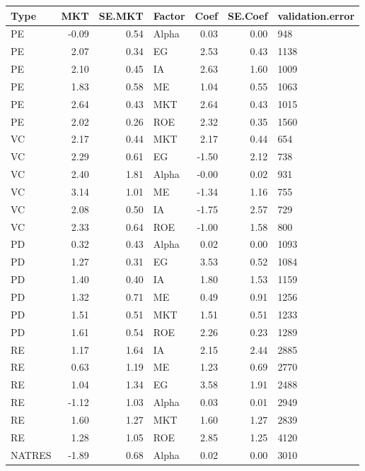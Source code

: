 \documentclass[12pt]{article}
\begin{document}
\begin{table}[ht]
	\centering
	\begin{tabular}{lrrlrrl}
		\hline
		Type & MKT & SE.MKT & Factor & Coef & SE.Coef & validation.error \\ 
		\hline
		PE & -0.09 & 0.54 & Alpha & 0.03 & 0.00 & 948 \\ 
		PE & 2.07 & 0.34 & EG & 2.53 & 0.43 & 1138 \\ 
		PE & 2.10 & 0.45 & IA & 2.63 & 1.60 & 1009 \\ 
		PE & 1.83 & 0.58 & ME & 1.04 & 0.55 & 1063 \\ 
		PE & 2.64 & 0.43 & MKT & 2.64 & 0.43 & 1015 \\ 
		PE & 2.02 & 0.26 & ROE & 2.32 & 0.35 & 1560 \\ 
		VC & 2.17 & 0.44 & MKT & 2.17 & 0.44 & 654 \\ 
		VC & 2.29 & 0.61 & EG & -1.50 & 2.12 & 738 \\ 
		VC & 2.40 & 1.81 & Alpha & -0.00 & 0.02 & 931 \\ 
		VC & 3.14 & 1.01 & ME & -1.34 & 1.16 & 755 \\ 
		VC & 2.08 & 0.50 & IA & -1.75 & 2.57 & 729 \\ 
		VC & 2.33 & 0.64 & ROE & -1.00 & 1.58 & 800 \\ 
		PD & 0.32 & 0.43 & Alpha & 0.02 & 0.00 & 1093 \\ 
		PD & 1.27 & 0.31 & EG & 3.53 & 0.52 & 1084 \\ 
		PD & 1.40 & 0.40 & IA & 1.80 & 1.53 & 1159 \\ 
		PD & 1.32 & 0.71 & ME & 0.49 & 0.91 & 1256 \\ 
		PD & 1.51 & 0.51 & MKT & 1.51 & 0.51 & 1233 \\ 
		PD & 1.61 & 0.54 & ROE & 2.26 & 0.23 & 1289 \\ 
		RE & 1.17 & 1.64 & IA & 2.15 & 2.44 & 2885 \\ 
		RE & 0.63 & 1.19 & ME & 1.23 & 0.69 & 2770 \\ 
		RE & 1.04 & 1.34 & EG & 3.58 & 1.91 & 2488 \\ 
		RE & -1.12 & 1.03 & Alpha & 0.03 & 0.01 & 2949 \\ 
		RE & 1.60 & 1.27 & MKT & 1.60 & 1.27 & 2839 \\ 
		RE & 1.28 & 1.05 & ROE & 2.85 & 1.25 & 4120 \\ 
		NATRES & -1.89 & 0.68 & Alpha & 0.02 & 0.00 & 3010 \\ 

\end{tabular}
\end{table}
\end{document}
